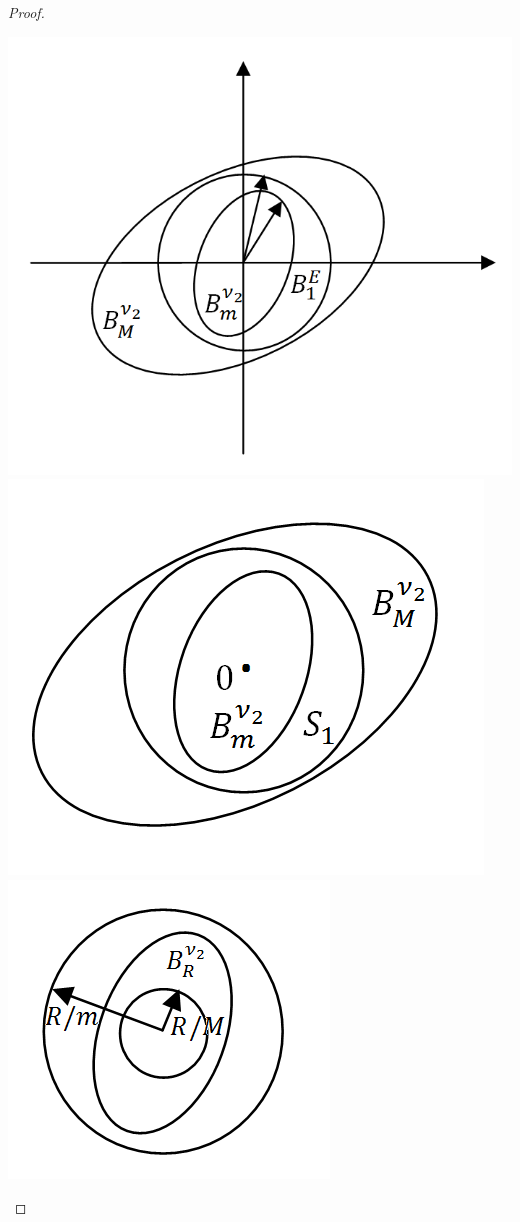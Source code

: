 \begin{proof}
\begin{enumerate}
        \begin{center}\includegraphics[scale=0.55]{l5_7.png}\includegraphics[scale=0.55]{l5_9.png}\includegraphics[scale=0.65]{l5_8.png}\end{center}
        

\end{enumerate}
\end{proof}
